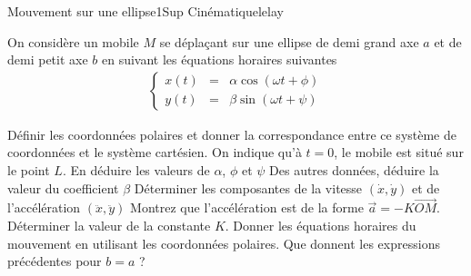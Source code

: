 \begin{exercise}{Mouvement sur une ellipse}{1}{Sup}
{Cinématique}{lelay}

On considère un mobile $M$ se déplaçant sur une ellipse de demi grand axe $a$ et de demi petit axe $b$ en suivant les équations horaires suivantes
\begin{align*}
    \left\{
    \begin{array}{ccc}
         x(t) &=& \alpha \cos(\omega t + \phi) \\
         y(t) &=& \beta \sin(\omega t + \psi)
    \end{array}
    \right.
\end{align*}

\begin{center}
\end{center}

\begin{questions}
    \questioncours Définir les coordonnées polaires et donner la correspondance entre ce système de coordonnées et le système cartésien.
    \question On indique qu'à $t = 0$, le mobile est situé sur le point $L$. En déduire les valeurs de $\alpha$, $\phi$ et $\psi$
    \question Des autres données, déduire la valeur du coefficient $\beta$
    \question Déterminer les composantes de la vitesse $(\dot x , \dot y)$ et de l'accélération $(\ddot x, \ddot y)$
    \question Montrez que l'accélération est de la forme $\vec{a} = - K \vec{OM}$. Déterminer la valeur de la constante $K$.
    \question Donner les équations horaires du mouvement en utilisant les coordonnées polaires.
    \question Que donnent les expressions précédentes pour $b = a$ ?
\end{questions}

\end{exercise}

